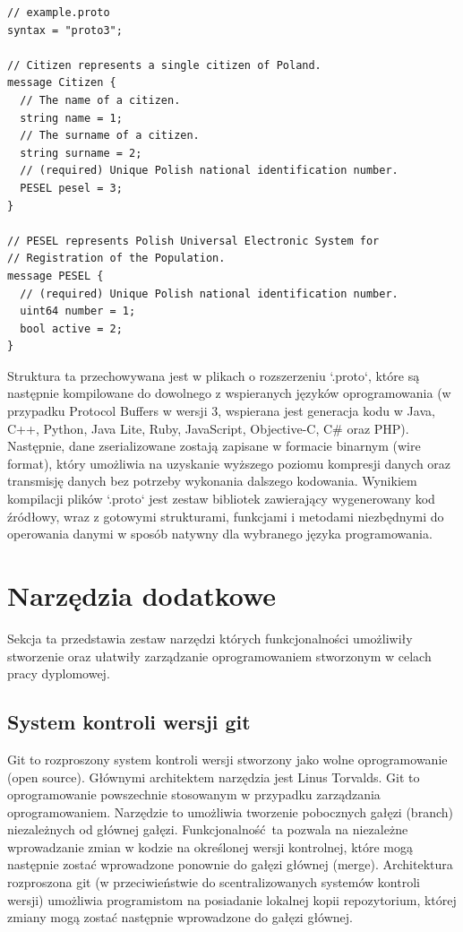 \documentclass[a4paper,12pt,twoside,openany]{report}
\begin{document}
\begin{lstlisting}
// example.proto
syntax = "proto3";

// Citizen represents a single citizen of Poland.
message Citizen {
  // The name of a citizen.
  string name = 1;
  // The surname of a citizen.
  string surname = 2;
  // (required) Unique Polish national identification number.
  PESEL pesel = 3;
}

// PESEL represents Polish Universal Electronic System for
// Registration of the Population.
message PESEL {
  // (required) Unique Polish national identification number.
  uint64 number = 1;
  bool active = 2;
}
\end{lstlisting}

Struktura ta przechowywana jest w plikach o rozszerzeniu `.proto`, które są następnie kompilowane do dowolnego z wspieranych języków oprogramowania 
(w przypadku Protocol Buffers w wersji 3, wspierana jest generacja kodu w Java, C++, Python, Java Lite, Ruby, JavaScript, Objective-C, C\# oraz PHP).
Następnie, dane zserializowane zostają zapisane w formacie binarnym (wire format), który umożliwia na uzyskanie wyższego poziomu kompresji danych oraz transmisję danych 
bez potrzeby wykonania dalszego kodowania. 
Wynikiem kompilacji plików `.proto` jest zestaw bibliotek zawierający wygenerowany kod źródłowy, wraz z gotowymi strukturami, funkcjami i metodami niezbędnymi do 
operowania danymi w sposób natywny dla wybranego języka programowania.

\section{Narzędzia dodatkowe}

Sekcja ta przedstawia zestaw narzędzi których funkcjonalności umożliwiły stworzenie oraz ułatwiły zarządzanie oprogramowaniem stworzonym w celach
pracy dyplomowej. 

\subsection{System kontroli wersji git}
Git to rozproszony system kontroli wersji stworzony jako wolne oprogramowanie (open source). 
Głównymi architektem narzędzia jest Linus Torvalds. Git to oprogramowanie powszechnie stosowanym w przypadku zarządzania oprogramowaniem.
Narzędzie to umożliwia tworzenie pobocznych gałęzi (branch) niezależnych od głównej gałęzi. Funkcjonalność ta pozwala na niezależne wprowadzanie zmian
w kodzie na określonej wersji kontrolnej, które mogą następnie zostać wprowadzone ponownie do gałęzi głównej (merge).
Architektura rozproszona git (w przeciwieństwie do scentralizowanych systemów kontroli wersji) umożliwia programistom na posiadanie lokalnej kopii repozytorium,
której zmiany mogą zostać następnie wprowadzone do gałęzi głównej.
\end{document}
